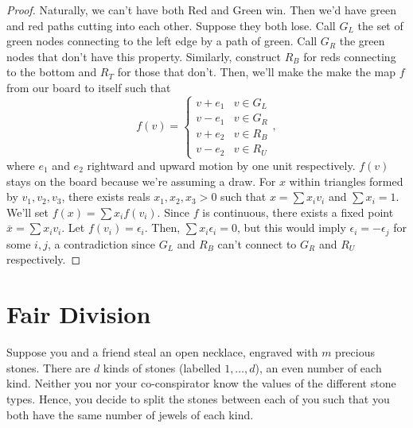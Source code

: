 \documentclass[12pt]{amsart}
\theoremstyle{definition}
\begin{document}
    \begin{proof}
        Naturally, we can't have both Red and Green win. Then we'd have green and red paths cutting into each other. Suppose they both lose. Call $G_L$ the set of green nodes connecting to the left edge by a path of green. Call $G_R$ the green nodes that don't have this property. Similarly, construct $R_B$ for reds connecting to the bottom and $R_T$ for those that don't. Then, we'll make the make the map $f$ from our board to itself such that $$f(v) = \begin{cases} v + e_1 & v \in G_L\\ v - e_1 & v \in G_R\\ v + e_2 & v \in R_B\\ v -e_2 & v \in R_U\end{cases},$$ where $e_1$ and $e_2$ rightward and upward motion by one unit respectively. $f(v)$ stays on the board because we're assuming a draw. For $x$ within triangles formed by $v_1,v_2,v_3$, there exists reals $x_1,x_2,x_3 > 0$ such that $x = \sum x_i v_i$ and $\sum x_i = 1$. We'll set $f(x) = \sum x_i f(v_i)$. Since $f$ is continuous, there exists a fixed point $\overline{x} = \sum x_iv_i$. Let $f(v_i) = \epsilon_i$. Then, $\sum x_i \epsilon_i = 0$, but this would imply $\epsilon_i = -\epsilon_j$ for some $i,j$, a contradiction since $G_L$ and $R_B$ can't connect to $G_R$ and $R_U$ respectively.
    \end{proof}

    \newpage

    \section{Fair Division}

    Suppose you and a friend steal an open necklace, engraved with $m$ precious stones. There are $d$ kinds of stones (labelled $1,\ldots,d$), an even number of each kind. Neither you nor your co-conspirator know the values of the different stone types. Hence, you decide to split the stones between each of you such that you both have the same number of jewels of each kind. 
\end{document}
